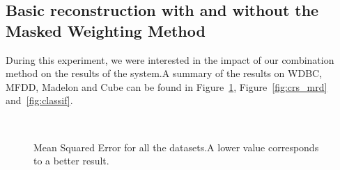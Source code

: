     \subsection{Basic reconstruction with and without the Masked Weighting Method}
\label{sec:msemrd}
	
During this experiment, we were interested in the impact of our combination method on the results of the system.\@ A summary of the results on WDBC, MFDD, Madelon and Cube can be found in Figure~\ref{fig:msemrd}, Figure~\ref{fig:crs_mrd} and~\ref{fig:classif}.

\begin{figure}[h]
\label{fig:msemrd}
    \centering
    \qquad
    \\
    \qquad
    \caption{Mean Squared Error for all the datasets.\@ A lower value corresponds to a better result.}
\end{figure}

